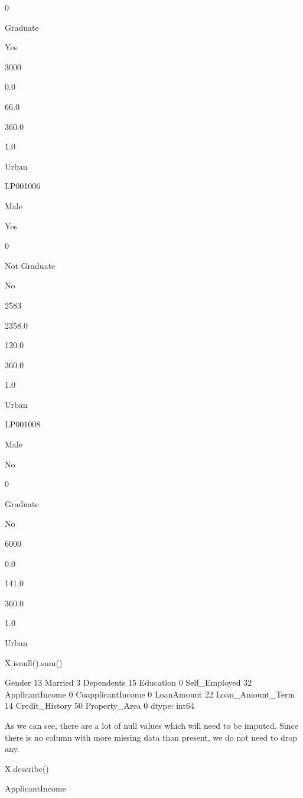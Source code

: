 \documentclass[]{article}
\newenvironment{Shaded}{}{}
\newcommand{\BuiltInTok}[1]{#1}
\newcommand{\NormalTok}[1]{#1}
\begin{document}
0

Graduate

Yes

3000

0.0

66.0

360.0

1.0

Urban

LP001006

Male

Yes

0

Not Graduate

No

2583

2358.0

120.0

360.0

1.0

Urban

LP001008

Male

No

0

Graduate

No

6000

0.0

141.0

360.0

1.0

Urban

\begin{Shaded}
\begin{Highlighting}[]
\NormalTok{X.isnull().}\BuiltInTok{sum}\NormalTok{()}
\end{Highlighting}
\end{Shaded}

Gender 13 Married 3 Dependents 15 Education 0 Self\_Employed 32
ApplicantIncome 0 CoapplicantIncome 0 LoanAmount 22 Loan\_Amount\_Term
14 Credit\_History 50 Property\_Area 0 dtype: int64

As we can see, there are a lot of null values which will need to be
imputed. Since there is no column with more missing data than present,
we do not need to drop any.

\begin{Shaded}
\begin{Highlighting}[]
\NormalTok{X.describe()}
\end{Highlighting}
\end{Shaded}

ApplicantIncome
\end{document}
